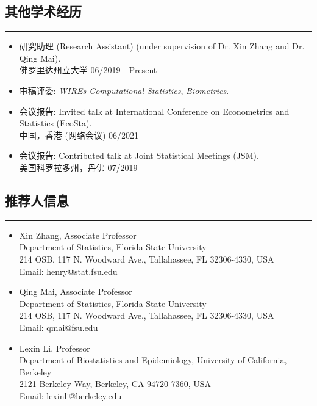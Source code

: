 \documentclass[10pt, oneside]{article}
\begin{document}
\subsection*{其他学术经历}
\noindent\rule{\textwidth}{1pt}
\begin{itemize}[itemsep=-1pt]
    \item 研究助理 (Research Assistant) (under supervision of Dr. Xin Zhang and Dr. Qing Mai). \\
    佛罗里达州立大学 \hfill 06/2019 - Present
    \item 审稿评委: \textit{WIREs Computational Statistics}, \textit{Biometrics}.
    \item 会议报告: Invited talk at International Conference on Econometrics and Statistics (EcoSta).\\
    中国，香港 (网络会议) \hfill 06/2021
    \item 会议报告: Contributed talk at Joint Statistical Meetings (JSM).\\
    美国科罗拉多州，丹佛 \hfill 07/2019


\end{itemize}


\subsection*{推荐人信息}
\noindent\rule{\textwidth}{1pt}
\begin{itemize}[itemsep=0pt]
    \item Xin Zhang, Associate Professor \\
    Department of Statistics, Florida State University\\
    214 OSB, 117 N. Woodward Ave., Tallahassee, FL 32306-4330, USA\\
    Email: henry@stat.fsu.edu
    \item Qing Mai, Associate Professor \\
    Department of Statistics, Florida State University\\
    214 OSB, 117 N. Woodward Ave., Tallahassee, FL 32306-4330, USA\\
    Email: qmai@fsu.edu
    \item Lexin Li, Professor\\
    Department of Biostatistics and Epidemiology, University of California, Berkeley\\
    2121 Berkeley Way, Berkeley, CA 94720-7360, USA\\
    Email: lexinli@berkeley.edu
\end{itemize}
\end{document}
